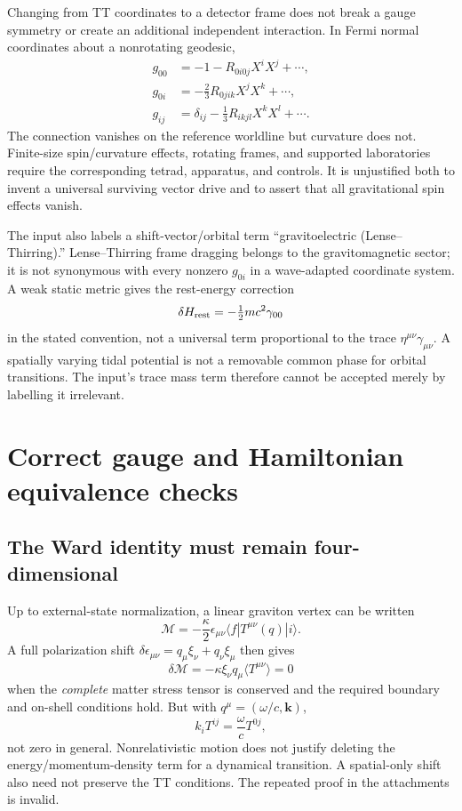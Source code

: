 \documentclass[a4paper,11pt]{article}
\begin{document}
Changing from TT coordinates to a detector frame does not break a gauge symmetry or create an additional independent interaction. In Fermi normal coordinates about a nonrotating geodesic,~\cite{manasse}
\begin{align}
 g_{00}&=-1-R_{0i0j}X^iX^j+\cdots,\\
 g_{0i}&=-\tfrac23R_{0jik}X^jX^k+\cdots,\\
 g_{ij}&=\delta_{ij}-\tfrac13R_{ikjl}X^kX^l+\cdots.
\end{align}
The connection vanishes on the reference worldline but curvature does not. Finite-size spin/curvature effects, rotating frames, and supported laboratories require the corresponding tetrad, apparatus, and controls. It is unjustified both to invent a universal surviving vector drive and to assert that all gravitational spin effects vanish.

The input also labels a shift-vector/orbital term ``gravitoelectric (Lense--Thirring).'' Lense--Thirring frame dragging belongs to the gravitomagnetic sector; it is not synonymous with every nonzero $g_{0i}$ in a wave-adapted coordinate system. A weak static metric gives the rest-energy correction
\begin{equation}
 \delta H_{\rm rest}=-\tfrac12mc^2\gamma_{00}
\end{equation}
in the stated convention, not a universal term proportional to the trace $\eta^{\mu\nu}\gamma_{\mu\nu}$. A spatially varying tidal potential is not a removable common phase for orbital transitions. The input's trace mass term therefore cannot be accepted merely by labelling it irrelevant.

\section{Correct gauge and Hamiltonian equivalence checks}
\label{sec:ward}

\subsection{The Ward identity must remain four-dimensional}

Up to external-state normalization, a linear graviton vertex can be written
\begin{equation}
 \mathcal M=-\frac\kappa2\epsilon_{\mu\nu}\langle f|T^{\mu\nu}(q)|i\rangle.
\end{equation}
A full polarization shift $\delta\epsilon_{\mu\nu}=q_\mu\xi_\nu+q_\nu\xi_\mu$ then gives
\begin{equation}
 \delta\mathcal M=-\kappa\xi_\nu q_\mu\langle T^{\mu\nu}\rangle=0
\end{equation}
when the \emph{complete} matter stress tensor is conserved and the required boundary and on-shell conditions hold. But with $q^\mu=(\omega/c,\bm k)$,
\begin{equation}
 k_iT^{ij}=\frac\omega c T^{0j},
\end{equation}
not zero in general. Nonrelativistic motion does not justify deleting the energy/momentum-density term for a dynamical transition. A spatial-only shift also need not preserve the TT conditions. The repeated proof in the attachments is invalid.
\end{document}
